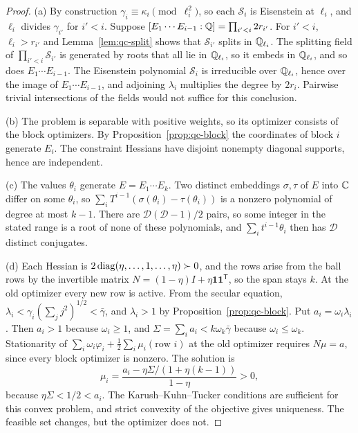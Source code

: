 \begin{proof}
(a) By construction $\gamma_i\equiv\kappa_i\pmod{\ell_i^2}$, so each
$\mathcal S_i$ is Eisenstein at $\ell_i$, and $\ell_i$ divides $\gamma_{i'}$
for $i'<i$. Suppose $[E_1\cdots E_{i-1}:\mathbb Q]=\prod_{i'<i}2r_{i'}$. For
$i'<i$, $\ell_i>r_{i'}$ and Lemma~\ref{lem:qc-split} shows that
$\mathcal S_{i'}$ splits in $\mathbb Q_{\ell_i}$. The splitting field of
$\prod_{i'<i}\mathcal S_{i'}$ is generated by roots that all lie in
$\mathbb Q_{\ell_i}$, so it embeds in $\mathbb Q_{\ell_i}$, and so does $E_1\cdots E_{i-1}$.
The Eisenstein polynomial $\mathcal S_i$ is irreducible over $\mathbb Q_{\ell_i}$,
hence over the image of $E_1\cdots E_{i-1}$, and adjoining $\lambda_i$
multiplies the degree by $2r_i$. Pairwise trivial intersections of the
fields would not suffice for this conclusion.

(b) The problem is separable with positive weights, so its optimizer consists
of the block optimizers. By Proposition~\ref{prop:qc-block} the coordinates
of block $i$ generate $E_i$. The constraint Hessians have disjoint nonempty
diagonal supports, hence are independent.

(c) The values $\theta_i$ generate $E=E_1\cdots E_k$. Two distinct
embeddings $\sigma,\tau$ of $E$ into $\mathbb C$ differ on some $\theta_i$, so
$\sum_iT^{i-1}(\sigma(\theta_i)-\tau(\theta_i))$ is a nonzero polynomial of degree at
most $k-1$. There are $\mathcal D(\mathcal D-1)/2$ pairs, so some integer in
the stated range is a root of none of these polynomials, and
$\sum_it^{i-1}\theta_i$ then has $\mathcal D$ distinct conjugates.

(d) Each Hessian is $2\operatorname{diag}(\eta,\ldots,1,\ldots,\eta)\succ0$, and the rows
arise from the ball rows by the invertible matrix
$N=(1-\eta)I+\eta\mathbf1\mathbf1^{\mathsf T}$, so the span stays $k$. At the
old optimizer every new row is active. From the secular equation,
$\lambda_i<\gamma_i(\sum_jj^2)^{1/2}<\bar\gamma$, and $\lambda_i>1$ by
Proposition~\ref{prop:qc-block}. Put $a_i=\omega_i\lambda_i$. Then $a_i>1$
because $\omega_i\ge1$, and $\Sigma=\sum_ia_i<k\omega_k\bar\gamma$ because
$\omega_i\le\omega_k$. Stationarity of
$\sum_i\omega_i\varphi_i+\tfrac12\sum_i\mu_i(\text{row }i)$ at the old
optimizer requires $N\mu=a$, since every block optimizer is nonzero. The
solution is
\[
\mu_i=\frac{a_i-\eta\Sigma/(1+\eta(k-1))}{1-\eta}>0,
\]
because $\eta\Sigma<1/2<a_i$. The Karush--Kuhn--Tucker conditions are
sufficient for this convex problem, and strict convexity of the objective
gives uniqueness. The feasible set changes, but the optimizer does not.


\end{proof}
